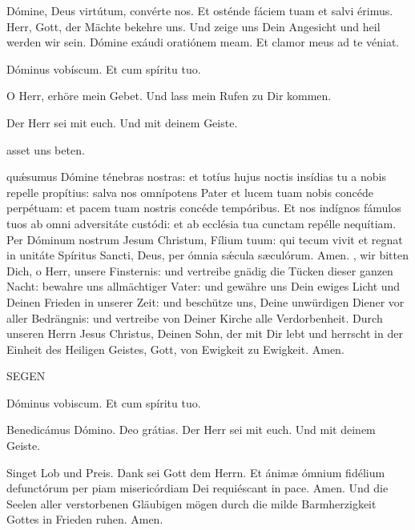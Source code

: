 \documentclass[fontsize=10pt,paper=A5,twoside,BCOR=1mm,DIV=21,headinclude]{scrarticle}
\newcommand{\DHSME}{\V Der Herr sei mit euch. \R Und mit deinem Geiste.}
\newcommand{\DHL}{\DHSME

\hfill\red{L}asset uns beten.\hfill\null}
\renewcommand{\hora}[1]{
	\addcontentsline{toc}{section}{#1}
	\chead{#1}
	\vspace{.5em}
	{\centering\small{\uppercase{#1}}

		\vspace{.5em}
	}
}
\begin{document}
\begin{paracol}{2} \pcb
\V Dómine, Deus virtútum, convérte nos.
\R Et osténde fáciem tuam et salvi érimus.
	\switchcolumn
	\V Herr, Gott, der Mächte bekehre uns.
	\R Und zeige uns Dein Angesicht und heil werden wir sein.
\switchcolumn*
\V Dómine exáudi oratiónem meam.
\R Et clamor meus ad te véniat.

\V Dóminus vobíscum.
\R Et cum spíritu tuo.

\oremus

	\switchcolumn
	\V O Herr, erhöre mein Gebet.
	\R Und lass mein Rufen zu Dir kommen.

	\DHL

\switchcolumn*
{} qu\'æsumus Dómine ténebras nostras: et totíus hujus noctis insídias tu a nobis repelle propítius: salva nos omnípotens Pater et lucem tuam nobis concéde perpétuam: et pacem tuam nostris concéde tempóribus. Et nos indígnos fámulos tuos ab omni adversitáte custódi: et ab ecclésia tua cunctam repélle nequítiam.
Per Dóminum nostrum Jesum Christum, Fílium tuum: qui tecum vivit et regnat in unitáte Spíritus Sancti, Deus, per ómnia s\'æcula sæculórum.
\R Amen.
	\switchcolumn
	, wir bitten Dich, o Herr, unsere Finsternis: und vertreibe gnädig die Tücken dieser ganzen Nacht: bewahre uns allmächtiger Vater: und gewähre uns Dein ewiges Licht und Deinen Frieden in unserer Zeit: und beschütze uns, Deine unwürdigen Diener vor aller Bedrängnis: und vertreibe von Deiner Kirche alle Verdorbenheit.
Durch unseren Herrn Jesus Christus, Deinen Sohn, der mit Dir lebt und herrscht in der Einheit des Heiligen Geistes, Gott, von Ewigkeit zu Ewigkeit.
	\R Amen.
\end{paracol}


\hora{Segen}

\begin{paracol}{2}\pcb
\V Dóminus vobiscum.
\R Et cum spíritu tuo.

\V Benedicámus Dómino.
\R Deo grátias.
	\switchcolumn
	\DHSME

	\V Singet Lob und Preis.
	\R Dank sei Gott dem Herrn.
\switchcolumn*
\V Et ánimæ ómnium fidélium defunctórum per piam misericórdiam Dei requiéscant in pace.
\R Amen.
	\switchcolumn
	\V Und die Seelen aller verstorbenen Gläubigen mögen durch die milde Barmherzigkeit Gottes in Frieden ruhen.
	\R Amen.
\end{paracol}
\end{document}
